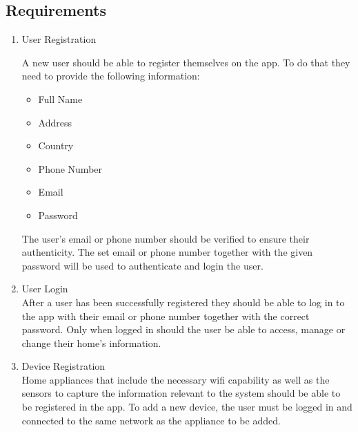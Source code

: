 \documentclass[10pt]{article}
\begin{document}
\begin{multicols}{2}
\section{Requirements}

\begin{enumerate}
  \item {User Registration}
  
  A new user should be able to register themselves on the app. To do that they need to provide the following information:

  \begin{itemize}
    \item Full Name
  
    \item Address
  
    \item Country
  
    \item Phone Number
  
    \item Email
  
    \item Password
  
  \end{itemize}

  The user's email or phone number should be verified to ensure their authenticity. The set email or phone number together with the given password will be used to authenticate and login the user.

  \item {User Login}\\
  After a user has been successfully registered they should be able to log in to the app with their email or phone number together with the correct password. Only when logged in should the user be able to access, manage or change their home's information.

  \item {Device Registration} \\
  Home appliances that include the necessary wifi capability as well as the sensors to capture the information relevant to the system should be able to be registered in the app. To add a new device, the user must be logged in and connected to the same network as the appliance to be added.
  

\end{enumerate}
\end{multicols}
\end{document}
